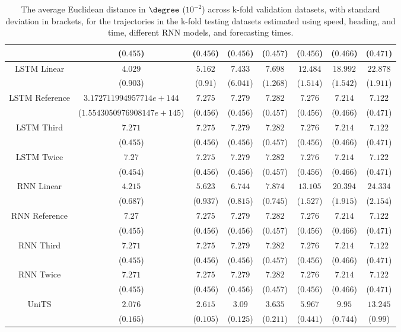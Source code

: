 \begin{table}[!ht]
{\begin{tabular}{|c|c|c|c|c|c|c|c|}
			 & ($0.455$) & ($0.456$) & ($0.456$) & ($0.457$) & ($0.456$) & ($0.466$) & ($0.471$) \\ \hline
			\multirow{2}{*}{LSTM Linear} & $4.029$ & $5.162$ & $7.433$ & $7.698$ & $12.484$ & $18.992$ & $22.878$ \\
			 & ($0.903$) & ($0.91$) & ($6.041$) & ($1.268$) & ($1.514$) & ($1.542$) & ($1.911$) \\ \hline
			\multirow{2}{*}{LSTM Reference} & $3.172711994957714e+144$ & $7.275$ & $7.279$ & $7.282$ & $7.276$ & $7.214$ & $7.122$ \\
			 & ($1.5543050976908147e+145$) & ($0.456$) & ($0.456$) & ($0.457$) & ($0.456$) & ($0.466$) & ($0.471$) \\ \hline
			\multirow{2}{*}{LSTM Third} & $7.271$ & $7.275$ & $7.279$ & $7.282$ & $7.276$ & $7.214$ & $7.122$ \\
			 & ($0.455$) & ($0.456$) & ($0.456$) & ($0.457$) & ($0.456$) & ($0.466$) & ($0.471$) \\ \hline
			\multirow{2}{*}{LSTM Twice} & $7.27$ & $7.275$ & $7.279$ & $7.282$ & $7.276$ & $7.214$ & $7.122$ \\
			 & ($0.454$) & ($0.456$) & ($0.456$) & ($0.457$) & ($0.456$) & ($0.466$) & ($0.471$) \\ \hline
			\multirow{2}{*}{RNN Linear} & $4.215$ & $5.623$ & $6.744$ & $7.874$ & $13.105$ & $20.394$ & $24.334$ \\
			 & ($0.687$) & ($0.937$) & ($0.815$) & ($0.745$) & ($1.527$) & ($1.915$) & ($2.154$) \\ \hline
			\multirow{2}{*}{RNN Reference} & $7.27$ & $7.275$ & $7.279$ & $7.282$ & $7.276$ & $7.214$ & $7.122$ \\
			 & ($0.455$) & ($0.456$) & ($0.456$) & ($0.457$) & ($0.456$) & ($0.466$) & ($0.471$) \\ \hline
			\multirow{2}{*}{RNN Third} & $7.271$ & $7.275$ & $7.279$ & $7.282$ & $7.276$ & $7.214$ & $7.122$ \\
			 & ($0.455$) & ($0.456$) & ($0.456$) & ($0.457$) & ($0.456$) & ($0.466$) & ($0.471$) \\ \hline
			\multirow{2}{*}{RNN Twice} & $7.271$ & $7.275$ & $7.279$ & $7.282$ & $7.276$ & $7.214$ & $7.122$ \\
			 & ($0.455$) & ($0.456$) & ($0.456$) & ($0.457$) & ($0.456$) & ($0.466$) & ($0.471$) \\ \hline
			\multirow{2}{*}{UniTS} & $2.076$ & $2.615$ & $3.09$ & $3.635$ & $5.967$ & $9.95$ & $13.245$ \\
			 & ($0.165$) & ($0.105$) & ($0.125$) & ($0.211$) & ($0.441$) & ($0.744$) & ($0.99$) \\ \hline
		\end{tabular}
	}
	\caption{The average Euclidean distance in $\degree$ ($10^{-2}$) across k-fold validation datasets, with standard deviation in brackets, for the trajectories in the k-fold testing datasets estimated using speed, heading, and time, different RNN models, and forecasting times.}
	\label{tab:all_speed_actual_dir_euclid}
\end{table}